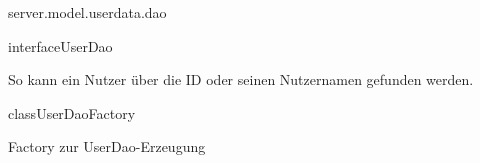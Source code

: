 \begin{texdocpackage}{server.model.userdata.dao}
\begin{texdocclass}{interface}{UserDao}
\begin{texdocclassmethods}
{ So kann ein Nutzer über die ID oder seinen Nutzernamen gefunden werden.}{\begin{texdocparameters}
\end{texdocparameters}
}
\end{texdocclassmethods}
\end{texdocclass}


\begin{texdocclass}{class}{UserDaoFactory}
\label{texdoclet:edu.kit.informatik.studyplan.server.model.userdata.dao.UserDaoFactory}
\begin{texdocclassintro}
Factory zur UserDao-Erzeugung\end{texdocclassintro}
\begin{texdocclassconstructors}
\end{texdocclassconstructors}
\begin{texdocclassmethods}
\end{texdocclassmethods}
\end{texdocclass}


\end{texdocpackage}



